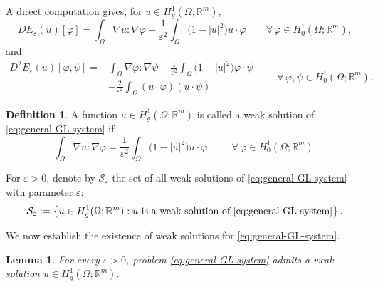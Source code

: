 \documentclass[11pt]{amsart}
\theoremstyle{definition}
\newtheorem{definition}[theorem]{Definition}
\theoremstyle{plain}
\newtheorem{lemma}[theorem]{Lemma}
\newcommand{\abs}[1]{\lvert#1\rvert}
\newcommand{\R}{\mathbb{R}}
\numberwithin{equation}{section}
\begin{document}
A direct computation gives, for
$u\in H_g^1(\Omega;\R^m)$,
\begin{equation}\label{eq:first-variation}
	DE_\varepsilon(u)[\varphi]
	=
	\int_\Omega
	\nabla u:\nabla\varphi
	-
	\frac{1}{\varepsilon^2}
	\int_\Omega
	\bigl(1-\abs{u}^2\bigr)u\cdot\varphi
	\qquad
	\forall\,\varphi\in H_0^1(\Omega;\R^m),
\end{equation}
and
\begin{equation}\label{eq:second-variation}
	\begin{aligned}
		D^2E_\varepsilon(u)[\varphi,\psi]
		={}&
		\int_\Omega
		\nabla\varphi:\nabla\psi
		-
		\frac{1}{\varepsilon^2}
		\int_\Omega
		\bigl(1-\abs{u}^2\bigr)\varphi\cdot\psi\\
		&+
		\frac{2}{\varepsilon^2}
		\int_\Omega
		(u\cdot\varphi)(u\cdot\psi)
	\end{aligned}
	\qquad
	\forall\,\varphi,\psi\in H_0^1(\Omega;\R^m).
\end{equation}

\begin{definition}
	A function $u\in H_g^1(\Omega;\R^m)$ is called a weak solution of
	\eqref{eq:general-GL-system} if
	\[
	\int_\Omega
	\nabla u:\nabla\varphi
	=
	\frac{1}{\varepsilon^2}
	\int_\Omega
	\bigl(1-\abs{u}^2\bigr)u\cdot\varphi,
	\qquad
	\forall\,\varphi\in H_0^1(\Omega;\R^m).
	\]
\end{definition}
For $\varepsilon>0$, denote by $\mathcal{S}_\varepsilon$ the set
of all weak solutions of \eqref{eq:general-GL-system} with parameter
$\varepsilon$:
\begin{equation}\label{eq:solution-set}
	\mathcal{S}_\varepsilon
	:=
	\left\{
	u\in H_g^1(\Omega;\R^m):
	u \text{ is a weak solution of }
	\eqref{eq:general-GL-system}
	\right\}.
\end{equation}

We now establish the existence of weak solutions for \eqref{eq:general-GL-system}.

\begin{lemma}\label{lem:existence}
	For every $\varepsilon>0$, problem
	\eqref{eq:general-GL-system} admits a weak solution
	$u\in H_g^1(\Omega;\R^m)$.
\end{lemma}
\end{document}
